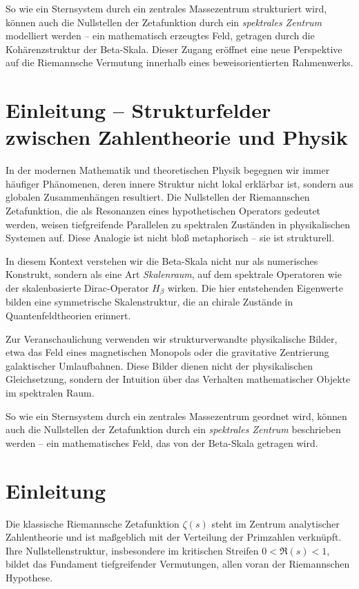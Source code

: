 \documentclass[12pt]{article}
\begin{document}
So wie ein Sternsystem durch ein zentrales Massezentrum strukturiert wird, können auch die Nullstellen der Zetafunktion durch ein \emph{spektrales Zentrum} modelliert werden – ein mathematisch erzeugtes Feld, getragen durch die Kohärenzstruktur der Beta-Skala. Dieser Zugang eröffnet eine neue Perspektive auf die Riemannsche Vermutung innerhalb eines beweisorientierten Rahmenwerks.

\section*{Einleitung – Strukturfelder zwischen Zahlentheorie und Physik}

In der modernen Mathematik und theoretischen Physik begegnen wir immer häufiger Phänomenen, deren innere Struktur nicht lokal erklärbar ist, sondern aus globalen Zusammenhängen resultiert. Die Nullstellen der Riemannschen Zetafunktion, die als Resonanzen eines hypothetischen Operators gedeutet werden, weisen tiefgreifende Parallelen zu spektralen Zuständen in physikalischen Systemen auf. Diese Analogie ist nicht bloß metaphorisch – sie ist strukturell.

In diesem Kontext verstehen wir die Beta-Skala nicht nur als numerisches Konstrukt, sondern als eine Art \emph{Skalenraum}, auf dem spektrale Operatoren wie der skalenbasierte Dirac-Operator $H_\beta$ wirken. Die hier entstehenden Eigenwerte bilden eine symmetrische Skalenstruktur, die an chirale Zustände in Quantenfeldtheorien erinnert.

Zur Veranschaulichung verwenden wir strukturverwandte physikalische Bilder, etwa das Feld eines magnetischen Monopols oder die gravitative Zentrierung galaktischer Umlaufbahnen. Diese Bilder dienen nicht der physikalischen Gleichsetzung, sondern der Intuition über das Verhalten mathematischer Objekte im spektralen Raum.

So wie ein Sternsystem durch ein zentrales Massezentrum geordnet wird, können auch die Nullstellen der Zetafunktion durch ein \emph{spektrales Zentrum} beschrieben werden – ein mathematisches Feld, das von der Beta-Skala getragen wird.


\section*{Einleitung}

Die klassische Riemannsche Zetafunktion \( \zeta(s) \) steht im Zentrum analytischer Zahlentheorie und ist maßgeblich mit der Verteilung der Primzahlen verknüpft. Ihre Nullstellenstruktur, insbesondere im kritischen Streifen \( 0 < \Re(s) < 1 \), bildet das Fundament tiefgreifender Vermutungen, allen voran der Riemannschen Hypothese.
\end{document}
